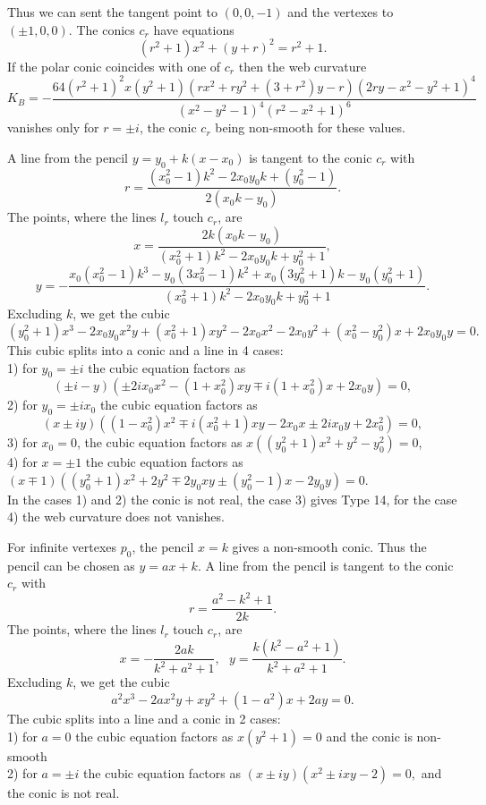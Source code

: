 \documentclass[11pt,a4paper]{article}
\begin{document}
Thus we can sent the tangent point to $(0,0,-1)$ and the vertexes to $(\pm 1,0,0)$. The conics $c_r$ have equations 
$$
(r^2 + 1)x^2 + (y+r)^2 = r^2+1.
$$
If the polar conic coincides with one of $c_r$ then the web curvature  
$$
K_B=-\frac{64(r^2 + 1)^2x(y^2 + 1)( rx^2 + ry^2+ (3+r^2)y - r )(2ry - x^2 - y^2 + 1)^4}{(x^2 - y^2 - 1)^4(r^2 - x^2 + 1)^6}
$$
vanishes only for $r=\pm i$, the conic $c_r$ being non-smooth for these values.

A line from the pencil $y=y_0+k(x-x_0)$ is tangent to the conic $c_r$ with
$$
r=\frac{(x_0^2 - 1)k^2 - 2x_0y_0k + (y_0^2 - 1)}{2(x_0k - y_0)}. 
$$ The points, where the lines $l_r$ touch $c_r$, are  
$$
x=\frac{2k(x_0k - y_0)}{(x_0^2 + 1)k^2 - 2x_0y_0k + y_0^2 + 1},$$
$$ 
y=-\frac{x_0(x_0^2 - 1)k^3 - y_0(3x_0^2 - 1)k^2 + x_0(3y_0^2 + 1)k - y_0(y_0^2 + 1)}{(x_0^2 + 1)k^2 - 2x_0y_0k + y_0^2 + 1}. 
$$ 
Excluding $k$, we get the cubic 
$$
(y_0^2 + 1)x^3 - 2x_0y_0x^2y+ (x_0^2 + 1)xy^2 - 2x_0x^2 - 2x_0y^2 + (x_0^2 - y_0^2)x  + 2x_0y_0y=0. 
$$
This cubic splits into a conic and a line in 4
 cases:\\ 
1) for $y_0=\pm i$ the cubic equation factors as 
$$
(\pm i-y)(\pm 2ix_0x^2 -(1+x_0^2)xy \mp i(1+x_0^2)x + 2x_0y)=0,
$$ 
 2)  for  $y_0=\pm ix_0$ the cubic equation factors as 
 $$
 (x \pm i y)((1-x_0^2)x^2  \mp i (x_0^2+1)xy - 2x_0x   \pm2 i x_0y + 2x_0^2)=0,
 $$
 3) for $x_0=0$, the cubic equation factors as $x((y_0^2 + 1)x^2 + y^2 - y_0^2)=0$,\\
 4) for $x=\pm 1$ the cubic equation factors as $(x\mp 1)((y_0^2 + 1)x^2+2y^2 \mp 2y_0xy \pm (y_0^2 - 1)x  - 2y_0y)=0.$\\   
In the cases 1) and 2) the conic is not real, the case 3) gives Type 14,  for the case 4) the web curvature does not vanishes. 



For infinite vertexes $p_0$, the pencil $x=k$ gives a non-smooth conic. Thus the pencil can be chosen as $y=ax+k$. A line from the pencil is tangent to the conic $c_r$ with
$$
r=\frac{a^2 - k^2 + 1}{2k}. 
$$ The points, where the lines $l_r$ touch $c_r$, are  
$$
x=-\frac{2ak}{k^2+a^2+1}, \ \ \ y=\frac{k( k^2-a^2 + 1)}{k^2+a^2+1}. 
$$ 
Excluding $k$, we get the cubic
$$
a^2x^3 - 2ax^2y + xy^2 +(1-a^2)x + 2ay=0. 
$$
The cubic splits into a line and a conic in 2 cases:\\
1) for $a=0$ the cubic equation factors as $x(y^2+1)=0$ and the conic is non-smooth\\
2) for $a=\pm i$  the cubic equation factors as $(x \pm i y)(x^2 \pm i xy-2)=0,$ and the conic is not real.
\end{document}
